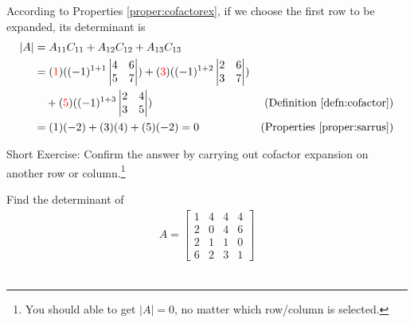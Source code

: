 \begin{solution}
According to Properties \ref{proper:cofactorex}, if we choose the first row to be expanded, its determinant is
\begin{align*}
|A| &= A_{11}C_{11} + A_{12}C_{12} + A_{13}C_{13} \\
&= 
(\textcolor{red}{1})((-1)^{1+1}
\begin{vmatrix}
4 & 6 \\
5 & 7
\end{vmatrix})
+
(\textcolor{red}{3})((-1)^{1+2}
\begin{vmatrix}
2 & 6 \\
3 & 7
\end{vmatrix}) \\
&\quad+ 
(\textcolor{red}{5})((-1)^{1+3}
\begin{vmatrix}
2 & 4 \\
3 & 5
\end{vmatrix}) & \text{(Definition \ref{defn:cofactor})}\\
&= (1)(-2) + (3)(4) + (5)(-2) = 0 & \text{(Properties \ref{proper:sarrus})} 
\end{align*}
\end{solution}
Short Exercise: Confirm the answer by carrying out cofactor expansion on another row or column.\footnote{You should able to get $|A| = 0$, no matter which row/column is selected.}
\begin{exmp}
\label{exmp:4x4det}
Find the determinant of
\begin{align*}
A = 
\begin{bmatrix}
1 & 4 & 4 & 4 \\
2 & 0 & 4 & 6 \\
2 & 1 & 1 & 0 \\
6 & 2 & 3 & 1
\end{bmatrix}
\end{align*}\
\end{exmp}
